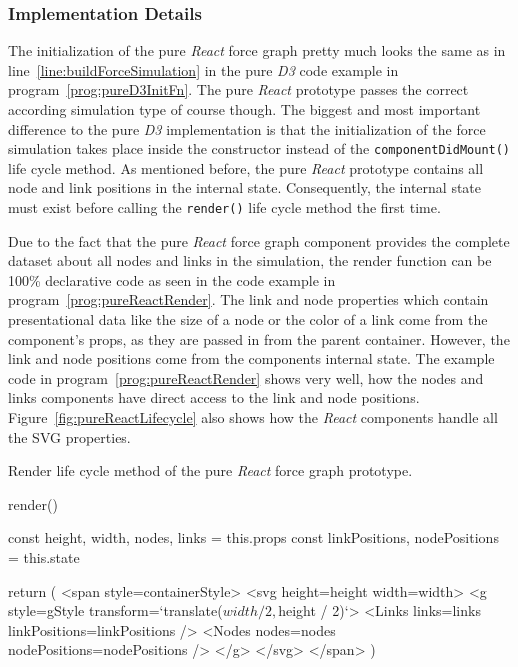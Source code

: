 \subsubsection{Implementation Details}

The initialization of the pure \emph{React} force graph pretty much looks the same as in line~\ref{line:buildForceSimulation} in the pure \emph{D3} code example in program~\ref{prog:pureD3InitFn}. The pure \emph{React} prototype passes the correct according simulation type of course though. The biggest and most important difference to the pure \emph{D3} implementation is that the initialization of the force simulation takes place inside the constructor instead of the \texttt{componentDidMount()} life cycle method. As mentioned before, the pure \emph{React} prototype contains all node and link positions in the internal state. Consequently, the internal state must exist before calling the \texttt{render()} life cycle method the first time.

Due to the fact that the pure \emph{React} force graph component provides the complete dataset about all nodes and links in the simulation, the render function can be 100\% declarative code as seen in the code example in program~\ref{prog:pureReactRender}. The link and node properties which contain presentational data like the size of a node or the color of a link come from the component's props, as they are passed in from the parent container. However, the link and node positions come from the components internal state. The example code in program~\ref{prog:pureReactRender} shows very well, how the nodes and links components have direct access to the link and node positions. Figure~\ref{fig:pureReactLifecycle} also shows how the \emph{React} components handle all the SVG properties.

\begin{program}
\caption{Render life cycle method of the pure \emph{React} force graph prototype.}
\label{prog:pureReactRender}
\begin{JsCode}
render() {
  const { height, width, nodes, links } = this.props
  const { linkPositions, nodePositions } = this.state
  
  return (
    <span style={containerStyle}>
      <svg height={height} width={width}>
        <g style={gStyle} transform={`translate(${width / 2},${height / 2})`}>
          <Links links={links} linkPositions={linkPositions} />
          <Nodes nodes={nodes} nodePositions={nodePositions} />
        </g>
      </svg>
    </span>
  )
}
\end{JsCode}
\end{program}

